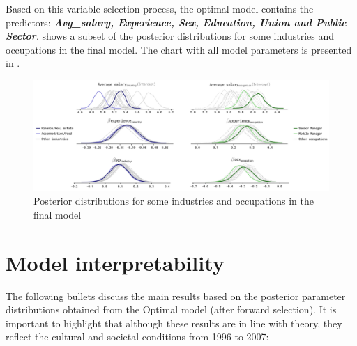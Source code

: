 Based on this variable selection process, the optimal model contains the predictors: \textbf{\textit{Avg\_salary, Experience, Sex, Education, Union and Public Sector}}.  shows a subset of the posterior distributions for some industries and occupations in the final model. The chart with all model parameters is presented in .

\begin{figure}[H]
    \centering
    \includegraphics[width=1.0\textwidth]{images/ch5_traces/trace_1.png}
    \setlength{\abovecaptionskip}{-5pt}
    \caption{Posterior distributions for some industries and occupations in the final model}
    \label{fig:final_posterior}
\end{figure}

\section{Model interpretability}

The following bullets discuss the main results based on the posterior parameter distributions obtained from the Optimal model (after forward selection). It is important to highlight that although these results are in line with theory, they reflect the cultural and societal conditions from 1996 to 2007: 

